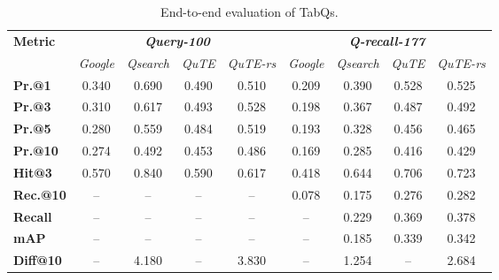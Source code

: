 \begin{table}[t]
  \small
  \caption{End-to-end evaluation of TabQs. }
  \vspace{-1em}
  \setlength{\tabcolsep}{0.25em}
  \centering
  \begin{tabular}{l|cccc|cccc}
    \hline
    \multirow{2}{*}{\textbf{Metric}} & \multicolumn{4}{c}{\textit{\textbf{Query-100}}} & \multicolumn{4}{|c}{\textit{\textbf{Q-recall-177}}}\\
    \cline{2-9}
    &  \textit{Google} & \textit{Qsearch} &  \textit{QuTE} & \textit{QuTE-rs} &
    \textit{Google} & \textit{Qsearch} &  \textit{QuTE} & \textit{QuTE-rs}\\
    \hline
    \textbf{Pr.@1}   &  0.340  & 0.690 & 0.490 & 0.510 &  0.209  & 0.390 & 0.528 & 0.525 \\
    \textbf{Pr.@3}   &  0.310  & 0.617 & 0.493 & 0.528 &  0.198 & 0.367 & 0.487 & 0.492 \\
    \textbf{Pr.@5}   &  0.280  & 0.559 & 0.484 & 0.519 & 0.193  & 0.328 & 0.456 & 0.465 \\
    \textbf{Pr.@10}  &  0.274  & 0.492 & 0.453 & 0.486 & 0.169  & 0.285 & 0.416 & 0.429 \\
    \hline
    \textbf{Hit@3}   &  0.570  & 0.840 & 0.590 & 0.617 & 0.418  & 0.644 & 0.706 & 0.723 \\
    \hline
    \textbf{Rec.@10} & -- & --    & --    & --    &  0.078  & 0.175 & 0.276 & 0.282 \\
    \textbf{Recall}  & -- & --    & --    & --    & -- & 0.229 & 0.369 & 0.378 \\
    \hline
    \textbf{mAP}     & -- & --    & --    & --    & -- & 0.185 & 0.339 & 0.342 \\
    \hline
    \textbf{Diff@10}     & -- &  4.180  & --    & 3.830   & -- & 1.254 & -- & 2.684 \\
    
    \hline
  \end{tabular}
  \label{table:performance_tabqs}
\end{table}
